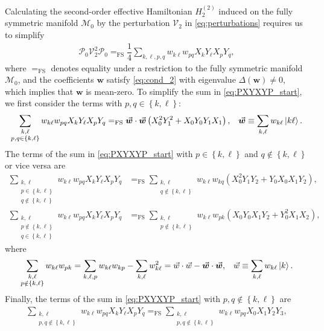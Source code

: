 \documentclass[nofootinbib,notitlepage,11pt]{revtex4-2}
\newcommand{\f}[2]{\dfrac{#1}{#2}} %
\newcommand{\p}[1]{\left(#1\right)} %
\renewcommand{\set}[1]{\left\{#1\right\}} %
\renewcommand{\c}{\cdot} %
\newcommand{\m}{\bm} %
\renewcommand{\v}{\vec} %
\newcommand{\1}{\mathds{1}}
\newcommand{\M}{\mathcal{M}}
\renewcommand{\P}{\mathcal{P}}
\newcommand{\V}{\mathcal{V}}
\newcommand{\EQFS}{=_{\text{FS}}}
\begin{document}
Calculating the second-order effective Hamiltonian $H_2^{(2)}$ induced
on the fully symmetric manifold $\M_0$ by the perturbation $\V_2$ in
\eqref{eq:perturbations} requires us to simplify
\begin{align}
  \P_0 \V_2^2 \P_0
  \EQFS \f14 \sum_{k,\ell,p,q}
  w_{k\ell} w_{pq} X_k Y_\ell X_p Y_q,
  \label{eq:PXYXYP_start}
\end{align}
where $\EQFS$ denotes equality under a restriction to the fully
symmetric manifold $\M_0$, and the coefficients $\m w$ satisfy
\eqref{eq:cond_2} with eigenvalue $\Delta\p{\m w}\ne0$, which implies
that $\m w$ is mean-zero.  To simplify the sum in
\eqref{eq:PXYXYP_start}, we first consider the terms with
$p,q\in\set{k,\ell}$:
\begin{align}
  \sum_{\substack{k,\ell\\p,q\in\set{k,\ell}}}
  w_{k\ell} w_{pq} X_k Y_\ell X_p Y_q
  \EQFS \v{\m w}\c\v{\m w} \p{X_0^2 Y_1^2 + X_0 Y_0 Y_1 X_1},
  &&
  \v{\m w} \equiv \sum_{k,\ell} w_{k\ell} \ket{k\ell}.
\end{align}
The terms of the sum in \eqref{eq:PXYXYP_start} with
$p\in\set{k,\ell}$ and $q\notin\set{k,\ell}$ or vice versa are
\begin{align}
  \sum_{\substack{k,\ell\\p\in\set{k,\ell}\\q\notin\set{k,\ell}}}
  w_{k\ell} w_{pq} X_k Y_\ell X_p Y_q
  &\EQFS \sum_{\substack{k,\ell\\q\notin\set{k,\ell}}}
  w_{k\ell} w_{k q} \p{X_0^2 Y_1 Y_2 + Y_0 X_0 X_1 Y_2}, \\
  \sum_{\substack{k,\ell\\p\notin\set{k,\ell}\\q\in\set{k,\ell}}}
  w_{k\ell} w_{pq} X_k Y_\ell X_p Y_q
  &\EQFS \sum_{\substack{k,\ell\\p\notin\set{k,\ell}}}
  w_{k\ell} w_{pk} \p{X_0 Y_0 X_1 Y_2 + Y_0^2 X_1 X_2},
\end{align}
where
\begin{align}
  \sum_{\substack{k,\ell\\p\notin\set{k,\ell}}} w_{k\ell} w_{pk}
  = \sum_{k,\ell,p} w_{k\ell} w_{kp} - \sum_{k,\ell} w_{k\ell}^2
  = \v w\c\v w - \v{\m w}\c\v{\m w},
  &&
  \v w \equiv \sum_{k,\ell} w_{k\ell} \ket{k}.
\end{align}
Finally, the terms of the sum in \eqref{eq:PXYXYP_start} with
$p,q\notin\set{k,\ell}$ are
\begin{align}
  \sum_{\substack{k,\ell\\p,q\notin\set{k,\ell}}}
  w_{k\ell} w_{pq} X_k Y_\ell X_p Y_q
  \EQFS \sum_{\substack{k,\ell\\p,q\notin\set{k,\ell}}}
  w_{k\ell} w_{pq} X_0 X_1 Y_2 Y_3,
\end{align}
\end{document}

